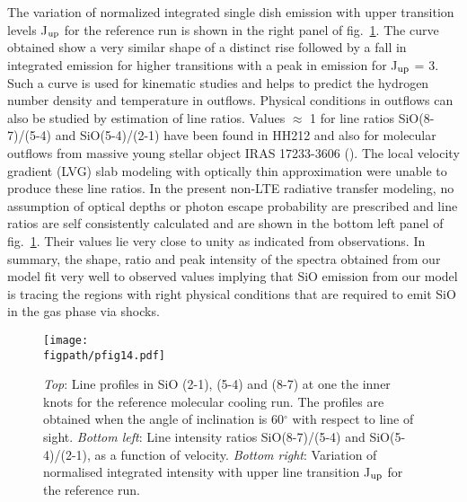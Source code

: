 \documentclass[useAMS,usenatbib]{mn2e}
\newcommand{\figpath}{/home/phybva/SiOJets_New/PAPER/NEWFIGS}
\begin{document}
The variation of normalized integrated single dish emission with upper transition
levels J$_{\rm up}$ for the reference run is shown in the
right panel of fig.~\ref{fig:lineratio}. The curve obtained 
show a very similar shape of a distinct rise followed by a fall in
integrated emission for higher transitions with a peak in
emission for J$_{\rm up}$ = 3. Such a curve is used for kinematic studies and 
helps to predict the hydrogen number density and temperature in outflows. Physical
conditions in outflows can also be studied by estimation of line ratios.
Values $\approx$ 1 for line ratios SiO(8-7)/(5-4) and SiO(5-4)/(2-1) have been
found in HH212 \citep{Cabrit:2007p13804,
  Lee:2008p13697} and also for molecular outflows from massive
young stellar object IRAS 17233-3606 (\citealt{Leurini:2013p13165}).
The local velocity gradient (LVG) slab modeling with optically thin approximation were unable to produce
these line ratios. 
In the present non-LTE radiative transfer modeling, no assumption of optical
depths or photon escape probability are prescribed and line ratios are
self consistently calculated and are shown in the bottom left panel of
fig.~\ref{fig:lineratio}. Their values lie very close to unity as
indicated from observations. 
In summary, the shape, ratio and peak intensity of the spectra
obtained from our model fit very well to observed values implying
that SiO emission from our model is tracing the regions with right physical
conditions that are required to emit SiO in the gas phase via shocks. 

\begin{figure*}
 \texttt{[image: \\figpath/pfig14.pdf]}%
 \caption{{\em{Top}}: Line profiles in SiO (2-1), (5-4) and (8-7) at one
   the inner knots for the reference molecular cooling run. The profiles are
   obtained when the angle of inclination is 60$^{\circ}$ with respect
 to line of sight. {\em{Bottom left}}: Line intensity ratios SiO(8-7)/(5-4)
and SiO(5-4)/(2-1), as a function of velocity. {\em{Bottom right}}:
Variation of normalised integrated intensity with upper line transition J$_{\rm
  up}$ for the reference run.}
\label{fig:lineratio}
\end{figure*}
\end{document}

